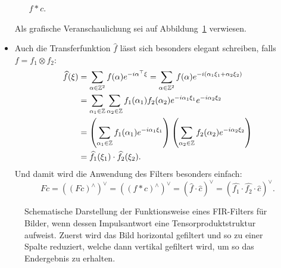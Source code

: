 \begin{remark}
\begin{itemize}
\begin{enumerate}
    $ f * c $.
  \end{enumerate}
  Als grafische Veranschaulichung sei auf Abbildung~\ref{fig:FIR-Filter-2D} verwiesen.
\item Auch die Transferfunktion $ \widehat{f} $ lässt sich besonders elegant schreiben, falls
  $ f = f_{1} \otimes f_{2} $:
  \begin{align*}
     \widehat{f}(\xi)
  &= \sum_{\alpha \in \mathbb{Z}^{2}} f(\alpha) e^{-i \alpha^{\top} \xi}
   = \sum_{\alpha \in \mathbb{Z}^{2}} f(\alpha) e^{-i (\alpha_{1}\xi_{1} + \alpha_{2}\xi_{2})} \\
  &= \sum_{\alpha_{1} \in \mathbb{Z}} \sum_{\alpha_{2} \in \mathbb{Z}} 
        f_{1}(\alpha_{1}) f_{2}(\alpha_{2}) e^{-i\alpha_{1}\xi_{1}} e^{-i\alpha_{2}\xi_{2}} \\
  &= \left( \sum_{\alpha_{1} \in \mathbb{Z}} f_{1}(\alpha_{1}) e^{-i\alpha_{1}\xi_{1}} \right)
        \left( \sum_{\alpha_{2} \in \mathbb{Z}} f_{2}(\alpha_{2}) e^{-i\alpha_{2}\xi_{2}} \right) \\
  &= \widehat{f_{1}}(\xi_{1}) \cdot \widehat{f_{2}}(\xi_{2}).
  \end{align*}
  Und damit wird die Anwendung des Filters besonders einfach:
  \[
      Fc
    = \left( (Fc)^{\wedge} \right)^{\vee}
    = \left( (f * c)^{\wedge} \right)^{\vee}
    = \left( \widehat{f} \cdot \widehat{c} \right)^{\vee}
    = \left( \widehat{f_{1}} \cdot \widehat{f_{2}} \cdot \widehat{c} \right)^{\vee}.
  \]
\end{itemize}
\begin{figure}[ht]
\centering
{}
\caption{Schematische Darstellung der Funktionsweise eines FIR-Filters für Bilder, wenn dessen
  Impulsantwort eine Tensorproduktstruktur aufweist. Zuerst wird das Bild horizontal gefiltert
  und so zu einer Spalte reduziert, welche dann vertikal gefiltert wird, um so das Endergebnis zu
  erhalten.}
\label{fig:FIR-Filter-2D}
\end{figure}
\end{remark}

\begin{example}
\end{example}